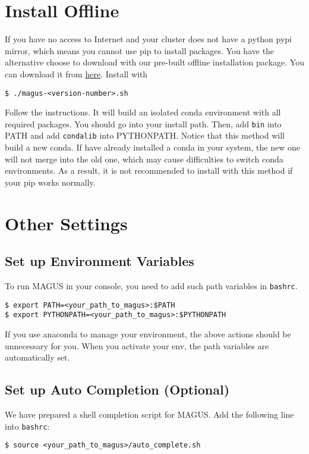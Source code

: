 \documentclass[12pt,oneside]{book}
\newcommand{\file}[1]{\texttt{#1}}
\newcommand{\chref}[3][blue]{\textcolor{#1}{\href{#2}{#3}}} %
\begin{document}
\section{Install Offline}
If you have no access to Internet and your cluster does not have a python pypi mirror, which means you cannot use pip to install packages. You have the alternative choose to download with our pre-built offline installation package. You can download it from \chref{https://gitlab.com/bigd4/magus/-/releases/}{here}. Install with 
\begin{tcolorbox}
    \begin{verbatim}
$ ./magus-<version-number>.sh
    \end{verbatim}
\end{tcolorbox}
Follow the instructions. It will build an isolated conda environment with all required packages. You should go into your install path. Then, add \file{bin} into PATH and add \file{condalib} into PYTHONPATH. Notice that this method will build a new conda. If have  already installed a conda in your system, the new one will not merge into the old one, which may cause difficulties to switch conda environments. As a result, it is not recommended to install with this method if your pip works normally.

\section{Other Settings}
\subsection{Set up Environment Variables}
To run MAGUS in your console, you need to add such path variables in \file{bashrc}.
\begin{tcolorbox}
    \begin{verbatim}
$ export PATH=<your_path_to_magus>:$PATH
$ export PYTHONPATH=<your_path_to_magus>:$PYTHONPATH
    \end{verbatim}
\end{tcolorbox}
If you use anaconda to manage your environment, the above actions should be unnecessary for you. When you activate your env, the path variables are automatically set.


\subsection{Set up Auto Completion (Optional)}
We have prepared a shell completion script for MAGUS. Add the following line into \file{bashrc}:
\begin{tcolorbox}
    \begin{verbatim}
$ source <your_path_to_magus>/auto_complete.sh
    \end{verbatim}
\end{tcolorbox}
\end{document}

